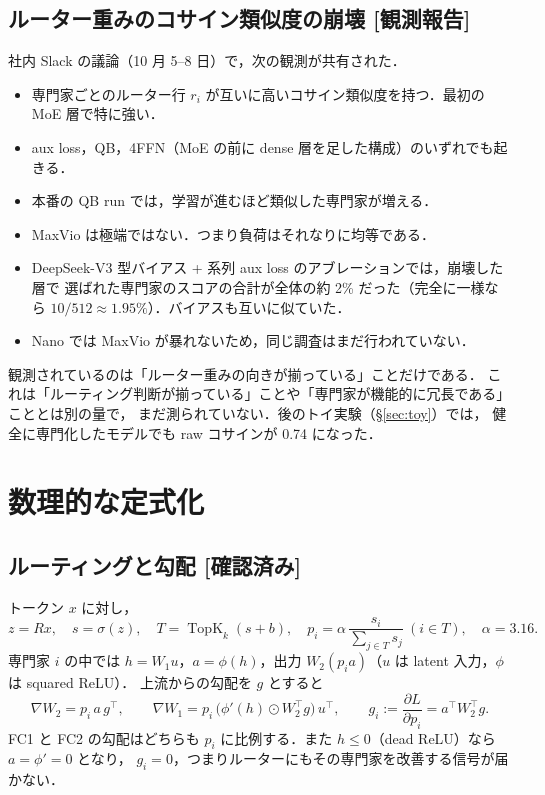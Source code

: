\documentclass[a4paper,11pt]{ltjsarticle}
\theoremstyle{definition}
\theoremstyle{plain}
\DeclareMathOperator{\TopK}{TopK}
\newcommand{\T}{^{\top}}
\newcommand{\Ver}{\textsf{\textcolor{cG}{[確認済み]}}}
\newcommand{\Obs}{\textsf{\textcolor{cB}{[観測報告]}}}
\begin{document}
\subsection{ルーター重みのコサイン類似度の崩壊 \Obs}
社内 Slack の議論（10 月 5--8 日）で，次の観測が共有された．
\begin{itemize}[leftmargin=*]
\item 専門家ごとのルーター行 $r_i$ が互いに高いコサイン類似度を持つ．最初の MoE 層で特に強い．
\item aux loss，QB，4FFN（MoE の前に dense 層を足した構成）のいずれでも起きる．
\item 本番の QB run では，学習が進むほど類似した専門家が増える．
\item MaxVio は極端ではない．つまり負荷はそれなりに均等である．
\item DeepSeek-V3 型バイアス + 系列 aux loss のアブレーションでは，崩壊した層で
  選ばれた専門家のスコアの合計が全体の約 2\% だった（完全に一様なら $10/512\approx1.95\%$）．バイアスも互いに似ていた．
\item Nano では MaxVio が暴れないため，同じ調査はまだ行われていない．
\end{itemize}

\begin{cautionbox}
観測されているのは「ルーター重みの向きが揃っている」ことだけである．
これは「ルーティング判断が揃っている」ことや「専門家が機能的に冗長である」こととは別の量で，
まだ測られていない．後のトイ実験（\S\ref{sec:toy}）では，
健全に専門化したモデルでも raw コサインが 0.74 になった．
\end{cautionbox}

\section{数理的な定式化}

\subsection{ルーティングと勾配 \Ver}
トークン $x$ に対し，
\begin{equation}
z = Rx,\quad s=\sigma(z),\quad T=\TopK_k(s+b),\quad
p_i = \alpha\,\frac{s_i}{\sum_{j\in T}s_j}\ (i\in T),\quad \alpha=3.16.
\end{equation}
専門家 $i$ の中では $h=W_1u$，$a=\phi(h)$，出力 $W_2(p_i a)$（$u$ は latent 入力，$\phi$ は squared ReLU）．
上流からの勾配を $g$ とすると
\begin{equation}
\nabla W_2 = p_i\,a\,g\T,\qquad
\nabla W_1 = p_i\,\big(\phi'(h)\odot W_2\T g\big)\,u\T,\qquad
g_i:=\frac{\partial L}{\partial p_i}=a\T W_2\T g.
\label{eq:expgrad}
\end{equation}
FC1 と FC2 の勾配はどちらも $p_i$ に比例する．また $h\le0$（dead ReLU）なら $a=\phi'=0$ となり，
$g_i=0$，つまりルーターにもその専門家を改善する信号が届かない．
\end{document}
